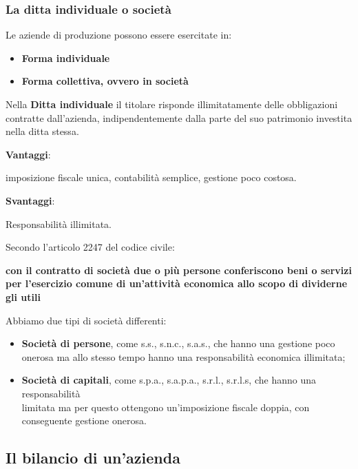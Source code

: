\documentclass[14pt]{extarticle}
\begin{document}
\subsubsection{La ditta individuale o società}

Le aziende di produzione possono essere esercitate in:

\begin{itemize}
    \item \textbf{Forma individuale}
    \item \textbf{Forma collettiva, ovvero in società} 
\end{itemize}

\newpage
Nella \textbf{Ditta individuale} il titolare risponde illimitatamente delle
obbligazioni contratte dall'azienda, indipendentemente dalla parte del suo
patrimonio investita nella ditta stessa.

\begin{center}
    \textbf{Vantaggi}:

    imposizione fiscale unica, contabilità semplice, gestione poco costosa.

    \textbf{Svantaggi}:

    Responsabilità illimitata.
\end{center}

Secondo l'articolo 2247 del codice civile:
\begin{center}
    \textbf{con il contratto di società due o più persone conferiscono beni o
servizi per l'esercizio comune di un'attività economica allo scopo di dividerne
gli utili}
\end{center}

Abbiamo due tipi di società differenti:

\begin{itemize}
    \item \textbf{Società di persone}, come s.s., s.n.c., s.a.s., che hanno una
    gestione poco onerosa ma allo stesso tempo hanno una responsabilità
    economica illimitata;
    \item \textbf{Società di capitali}, come s.p.a., s.a.p.a., s.r.l., s.r.l.s,
    che hanno una responsabilità \\
    limitata ma per questo ottengono un'imposizione fiscale doppia, con
    conseguente gestione onerosa. 
\end{itemize}

\subsection{Il bilancio di un'azienda}
\end{document}
